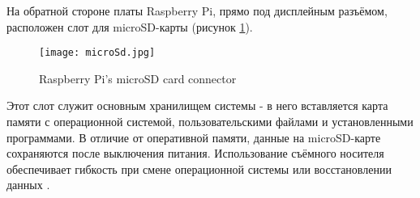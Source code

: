 На обратной стороне платы Raspberry Pi, прямо под дисплейным разъёмом, расположен слот для microSD-карты (рисунок \ref{fig:microSd}).

\begin{figure}[H]
	\centering
	\texttt{[image: microSd.jpg]}
	\caption{Raspberry Pi’s microSD card connector}
	\label{fig:microSd}
\end{figure}

Этот слот служит основным хранилищем системы - в него вставляется карта памяти с операционной системой, пользовательскими файлами и установленными программами. В отличие от оперативной памяти, данные на microSD-карте сохраняются после выключения питания. Использование съёмного носителя обеспечивает гибкость при смене операционной системы или восстановлении данных \cite{RaspberryPi}.
\newpage
